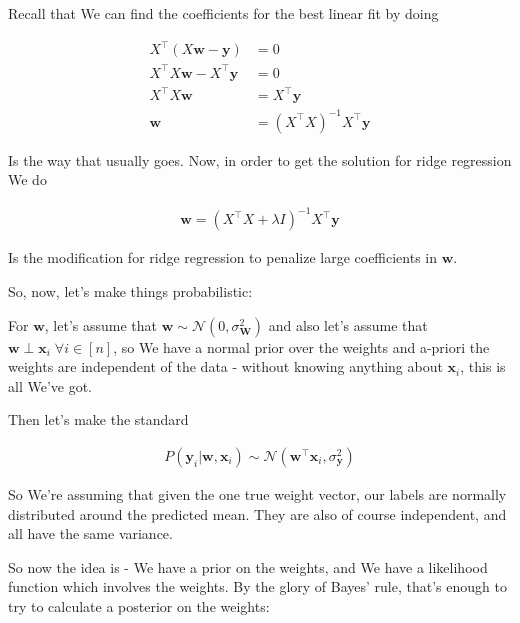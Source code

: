 \documentclass{article}
\begin{document}
		Recall that We can find the coefficients for the best linear fit by doing
		
		\begin{align}
			X^\top (X\mathbf{w} - \mathbf{y}) &= 0\\
			X^\top X\mathbf{w} - X^\top \mathbf{y} &= 0\\
			X^\top X\mathbf{w} &= X^\top \mathbf{y} \\
			\mathbf{w} &= (X^\top X)^{-1}X^\top \mathbf{y}
		\end{align}
		
		Is the way that usually goes. Now, in order to get the solution for ridge regression We do
		
		\begin{align}
			\mathbf{w} = (X^\top X + \lambda I)^{-1}X^\top \mathbf{y}
		\end{align}
				
		Is the modification for ridge regression to penalize large coefficients in $\mathbf{w}$. 
	
		So, now, let's make things probabilistic: 
		
		For $\mathbf{w}$, let's assume that $\mathbf{w}\sim\mathcal{N}(0, \sigma^2_{\mathbf{W}})$ and also let's assume that $\mathbf{w}\perp\mathbf{x}_i \;\forall i\in [n]$, so We have a normal prior over the weights and a-priori the weights are independent of the data - without knowing anything about $\mathbf{x}_i$, this is all We've got.
		
		Then let's make the standard 
		
		\begin{align}
			P(\mathbf{y}_i | \mathbf{w}, \mathbf{x}_i) \sim\mathcal{N}(\mathbf{w}^\top\mathbf{x}_i, \sigma^2_{\mathbf{y}})
		\end{align}
		
		So We're assuming that given the one true weight vector, our labels are normally distributed around the predicted mean. They are also of course independent, and all have the same variance. 
		
		So now the idea is - We have a prior on the weights, and We have a likelihood function which involves the weights. By the glory of Bayes' rule, that's enough to try to calculate a posterior on the weights:
		
\end{document}
